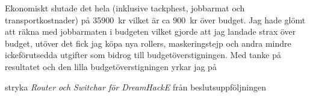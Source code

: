 \documentclass[../_main/handlingar.tex]{subfiles}
\begin{document}
Ekonomiskt slutade det hela (inklusive tackphest, jobbarmat och transportkostnader) på
\SI{35900}{kr} vilket är ca \SI{900}{kr} över budget. Jag hade glömt att räkna med jobbarmaten i budgeten
vilket gjorde att jag landade strax över budget, utöver det fick jag köpa nya rollers,
maskeringstejp och andra mindre ickeförutsedda utgifter som bidrog till
budgetöverstigningen. Med tanke på resultatet och den lilla budgetöverstigningen yrkar jag
på

\begin{attsatser}
    \att stryka \emph{Router och Switchar för DreamHackE} från beslutsuppföljningen
\end{attsatser}

\begin{signatures}{}
    \signature{Adam Belfrage}{}
\end{signatures}
\end{document}
